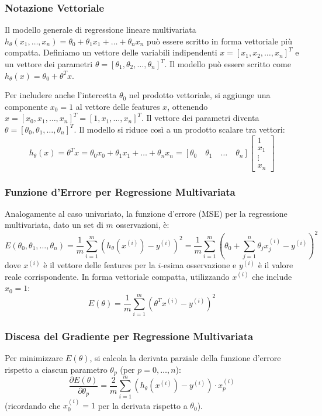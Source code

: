 \documentclass{article}
\begin{document}
\subsubsection{Notazione Vettoriale}
Il modello generale di regressione lineare multivariata $h_{\theta}(x_1, \dots, x_n) = \theta_0 + \theta_1 x_1 + \dots + \theta_n x_n$ può essere scritto in forma vettoriale più compatta. Definiamo un vettore delle variabili indipendenti $x = [x_1, x_2, \dots, x_n]^T$ e un vettore dei parametri $\theta = [\theta_1, \theta_2, \dots, \theta_n]^T$. Il modello può essere scritto come $h_{\theta}(x) = \theta_0 + \theta^T x$.

Per includere anche l'intercetta $\theta_0$ nel prodotto vettoriale, si aggiunge una componente $x_0 = 1$ al vettore delle features $x$, ottenendo $x = [x_0, x_1, \dots, x_n]^T = [1, x_1, \dots, x_n]^T$. Il vettore dei parametri diventa $\theta = [\theta_0, \theta_1, \dots, \theta_n]^T$.
Il modello si riduce così a un prodotto scalare tra vettori:
$$ h_{\theta}(x) = \theta^T x = \theta_0 x_0 + \theta_1 x_1 + \dots + \theta_n x_n = [\theta_0 \quad \theta_1 \quad \dots \quad \theta_n] \begin{bmatrix} 1 \\ x_1 \\ \vdots \\ x_n \end{bmatrix} $$

\subsubsection{Funzione d'Errore per Regressione Multivariata}
Analogamente al caso univariato, la funzione d'errore (MSE) per la regressione multivariata, dato un set di $m$ osservazioni, è:
$$ E(\theta_0, \theta_1, \dots, \theta_n) = \frac{1}{m} \sum_{i=1}^{m} (h_{\theta}(x^{(i)}) - y^{(i)})^2 = \frac{1}{m} \sum_{i=1}^{m} \left( \theta_0 + \sum_{j=1}^{n} \theta_j x_j^{(i)} - y^{(i)} \right)^2 $$
dove $x^{(i)}$ è il vettore delle features per la $i$-esima osservazione e $y^{(i)}$ è il valore reale corrispondente.
In forma vettoriale compatta, utilizzando $x^{(i)}$ che include $x_0=1$:
$$ E(\theta) = \frac{1}{m} \sum_{i=1}^{m} (\theta^T x^{(i)} - y^{(i)})^2 $$

\subsubsection{Discesa del Gradiente per Regressione Multivariata}
Per minimizzare $E(\theta)$, si calcola la derivata parziale della funzione d'errore rispetto a ciascun parametro $\theta_p$ (per $p=0, \dots, n$):
$$ \frac{\partial E(\theta)}{\partial \theta_p} = \frac{2}{m} \sum_{i=1}^{m} (h_{\theta}(x^{(i)}) - y^{(i)}) \cdot x_p^{(i)} $$
(ricordando che $x_0^{(i)} = 1$ per la derivata rispetto a $\theta_0$).
\end{document}
